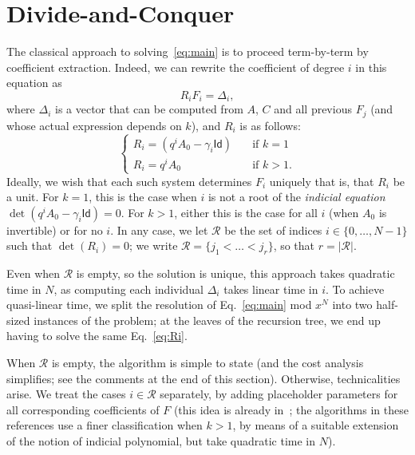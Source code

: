 \documentclass[]{sig-alternate}
\def\Id{\ensuremath{\mathsf{Id}}}
\def\mA {\ensuremath{{A}}}
\def\mC {\ensuremath{{C}}}
\def\mF {\ensuremath{{F}}}
\def\mR {\ensuremath{{R}}}
\begin{document}
\section{Divide-and-Conquer}\label{sec:dac}

The classical approach to solving~\eqref{eq:main} is to proceed
term-by-term by coefficient extraction. Indeed, we can rewrite the
coefficient of degree $i$ in this equation as
\begin{equation}\label{eq:Ri}
\mR_i \mF_i = \Delta_i,  
\end{equation}
where $\Delta_i$ is a vector that can be computed from
$\mA$, $\mC$ and all previous $\mF_j$ (and whose actual expression
depends on $k$), and $\mR_i$ is as follows:
\[\begin{cases}
\mR_i = (q^i \mA_0-\gamma_i\Id)&\quad\text{if $k=1$}\\
\mR_i = q^i\mA_0&\quad\text{if $k>1$}.
\end{cases}\]
Ideally, we wish that each such system determines $\mF_i$ uniquely
that is, that $\mR_i$ be a unit. For $k=1$, this is the case when $i$
is not a root of the {\em indicial equation} $\det(q^i
\mA_0-\gamma_i\Id)=0$. For $k>1$, either this is the case for all $i$
(when $\mA_0$ is invertible) or for no $i$. In any case, we let
$\mathcal{R}$ be the set of indices $i \in\{0,\dots,N-1\}$ such that
$\det(\mR_i) = 0$; we write $\mathcal{R}=\{j_1 < \dots <j_r\}$, so
that $r=|\mathcal{R}|$.

Even when $\mathcal{R}$ is empty, so the solution is unique, this
approach takes quadratic time in $N$, as computing each individual
$\Delta_i$ takes linear time in $i$. To achieve quasi-linear time, we
split the resolution of Eq.~\eqref{eq:main} mod $x^N$ into two
half-sized instances of the problem; at the leaves of the recursion
tree, we end up having to solve the same Eq.~\eqref{eq:Ri}.

When $\mathcal{R}$ is empty, the algorithm is simple to state (and the
cost analysis simplifies; see the comments at the end of this
section). Otherwise, technicalities arise.  We treat the cases $i \in
\mathcal{R}$ separately, by adding placeholder parameters for all
corresponding coefficients of $\mF$ (this idea is already
in~\cite{BaBrPf10,BaPf99}; the algorithms in these references use a
finer classification when $k>1$, by means of a suitable extension of
the notion of indicial polynomial, but take quadratic time in $N$).
\end{document}
